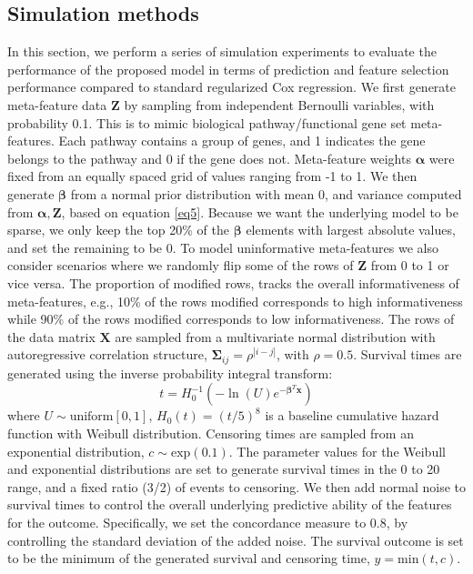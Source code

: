 \subsection{Simulation methods}
In this section, we perform a series of simulation experiments to evaluate the performance of the proposed model in terms of prediction and feature selection performance compared to standard regularized Cox regression. We first generate meta-feature data $\bm{Z}$ by sampling from independent Bernoulli variables, with probability 0.1. This is to mimic biological pathway/functional gene set meta-features. Each pathway contains a group of genes, and 1 indicates the gene belongs to the pathway and 0 if the gene does not. Meta-feature weights $\bm{\alpha}$ were fixed from an equally spaced grid of values ranging from -1 to 1. We then generate $\bm{\beta}$ from a normal prior distribution with mean 0, and variance computed from $\bm{\alpha, Z}$, based on equation \eqref{eq5}. Because we want the underlying model to be sparse, we only keep the top 20\% of the $\bm{\beta}$ elements with largest absolute values, and set the remaining to be 0. To model uninformative meta-features we also consider scenarios where we randomly flip some of the rows of $\bm{Z}$ from 0 to 1 or vice versa. The proportion of modified rows, tracks the overall informativeness of meta-features, e.g., 10\% of the rows modified corresponds to high informativeness while 90\% of the rows modified corresponds to low informativeness. The rows of the data matrix $\bm{X}$ are sampled from a multivariate normal distribution with autoregressive correlation structure, $\bm{\Sigma}_{ij} = \rho^{|i-j|}$, with $\rho=0.5$. Survival times are generated using the inverse probability integral transform:   
\begin{displaymath}
t = H_0^{-1}\left(-\ln(U)e^{-\bm{\beta}^T\bm{x}}\right)
\end{displaymath}
where $U\sim \text{uniform}[0,1]$, $H_0(t) = (t/5)^8$ is a baseline cumulative hazard function with Weibull distribution. Censoring times are sampled from an exponential distribution, $c\sim \text{exp}(0.1)$. The parameter values for the Weibull and exponential distributions are set to generate survival times in the 0 to 20 range, and a fixed ratio (3/2) of events to censoring. We then add normal noise to survival times to control the overall underlying predictive ability of the features for the outcome. Specifically, we set the concordance measure \citep{harrell1982evaluating} to 0.8, by controlling the standard deviation of the added noise. The survival outcome is set to be the minimum of the generated survival and censoring time, $y=\text{min}(t,c)$.

